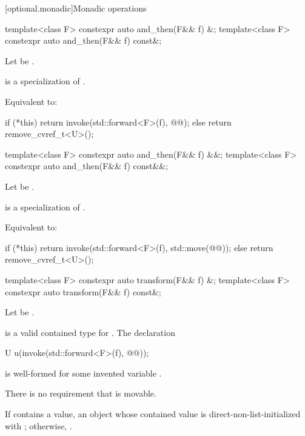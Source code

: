 [optional.monadic]{Monadic operations}

%
\begin{itemdecl}
template<class F>
  constexpr auto and_then(F&& f) &;
template<class F>
  constexpr auto and_then(F&& f) const&;
\end{itemdecl}

\begin{itemdescr}
\pnum
Let  be .

\pnum
\mandates
{} is a specialization of .

\pnum
\effects
Equivalent to:
\begin{codeblock}
if (*this) {
  return invoke(std::forward<F>(f), @@);
} else {
  return remove_cvref_t<U>();
}
\end{codeblock}
\end{itemdescr}

%
\begin{itemdecl}
template<class F>
  constexpr auto and_then(F&& f) &&;
template<class F>
  constexpr auto and_then(F&& f) const&&;
\end{itemdecl}

\begin{itemdescr}
\pnum
Let  be .

\pnum
\mandates
{} is a specialization of .

\pnum
\effects
Equivalent to:
\begin{codeblock}
if (*this) {
  return invoke(std::forward<F>(f), std::move(@@));
} else {
  return remove_cvref_t<U>();
}
\end{codeblock}
\end{itemdescr}

%
\begin{itemdecl}
template<class F>
  constexpr auto transform(F&& f) &;
template<class F>
  constexpr auto transform(F&& f) const&;
\end{itemdecl}

\begin{itemdescr}
\pnum
Let  be .

\pnum
\mandates
{} is a valid contained type for . The declaration
\begin{codeblock}
U u(invoke(std::forward<F>(f), @@));
\end{codeblock}
is well-formed for some invented variable .
\begin{note}
There is no requirement that  is movable.
\end{note}

\pnum
\returns
If  contains a value, an  object whose contained value is direct-non-list-initialized with ; otherwise, .
\end{itemdescr}

